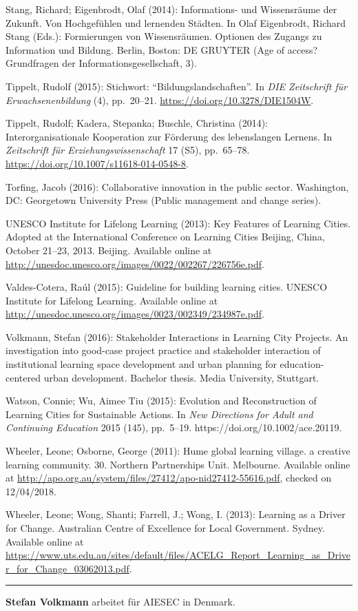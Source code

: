 \documentclass[a4paper,
fontsize=11pt,
oneside,
numbers=noperiodatend,
parskip=half-,
bibliography=totoc,
final
]{scrartcl}
\begin{document}
Stang, Richard; Eigenbrodt, Olaf (2014): Informations- und Wissensräume
der Zukunft. Von Hochgefühlen und lernenden Städten. In Olaf Eigenbrodt,
Richard Stang (Eds.): Formierungen von Wissensräumen. Optionen des
Zugangs zu Information und Bildung. Berlin, Boston: DE GRUYTER (Age of
access? Grundfragen der Informationsgesellschaft, 3).

Tippelt, Rudolf (2015): Stichwort: \enquote{Bildungslandschaften}. In
\emph{DIE Zeitschrift für Erwachsenenbildung} (4), pp.~20--21.
\url{https://doi.org/10.3278/DIE1504W}.

Tippelt, Rudolf; Kadera, Stepanka; Buschle, Christina (2014):
Interorganisationale Kooperation zur Förderung des lebenslangen Lernens.
In \emph{Zeitschrift für Erziehungswissenschaft} 17 (S5), pp.~65--78.
\url{https://doi.org/10.1007/s11618-014-0548-8}.

Torfing, Jacob (2016): Collaborative innovation in the public sector.
Washington, DC: Georgetown University Press (Public management and
change series).

UNESCO Institute for Lifelong Learning (2013): Key Features of Learning
Cities. Adopted at the International Conference on Learning Cities
Beijing, China, October 21--23, 2013. Beijing. Available online at
\url{http://unesdoc.unesco.org/images/0022/002267/226756e.pdf}.

Valdes-Cotera, Raúl (2015): Guideline for building learning cities.
UNESCO Institute for Lifelong Learning. Available online at
\url{http://unesdoc.unesco.org/images/0023/002349/234987e.pdf}.

Volkmann, Stefan (2016): Stakeholder Interactions in Learning City
Projects. An investigation into good-case project practice and
stakeholder interaction of institutional learning space development and
urban planning for education-centered urban development. Bachelor
thesis. Media University, Stuttgart.

Watson, Connie; Wu, Aimee Tiu (2015): Evolution and Reconstruction of
Learning Cities for Sustainable Actions. In \emph{New Directions for
Adult and Continuing Education} 2015 (145), pp.~5--19.
https://doi.org/10.1002/ace.20119.

Wheeler, Leone; Osborne, George (2011): Hume global learning village. a
creative learning community. 30. Northern Partnerships Unit. Melbourne.
Available online at
\url{http://apo.org.au/system/files/27412/apo-nid27412-55616.pdf},
checked on 12/04/2018.

Wheeler, Leone; Wong, Shanti; Farrell, J.; Wong, I. (2013): Learning as
a Driver for Change. Australian Centre of Excellence for Local
Government. Sydney. Available online at
\url{https://www.uts.edu.au/sites/default/files/ACELG_Report_Learning_as_Driver_for_Change_03062013.pdf}.

\begin{center}\rule{0.5\linewidth}{\linethickness}\end{center}

\textbf{Stefan Volkmann} arbeitet für AIESEC in Denmark.
\end{document}
